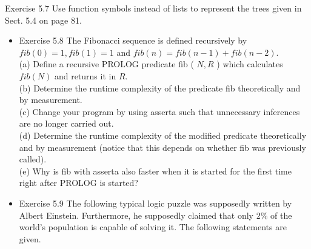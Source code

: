 \documentclass[10pt]{article}
\begin{document}
Exercise 5.7 Use function symbols instead of lists to represent the trees given in Sect. 5.4 on page 81.

\begin{itemize}
  \item Exercise 5.8 The Fibonacci sequence is defined recursively by $f i b(0)=1, f i b(1)=1$ and $f i b(n)=f i b(n-1)+f i b(n-2)$.\\
(a) Define a recursive PROLOG predicate fib ( $N, R$ ) which calculates $f i b(N)$ and returns it in $R$.\\
(b) Determine the runtime complexity of the predicate fib theoretically and by measurement.\\
(c) Change your program by using asserta such that unnecessary inferences are no longer carried out.\\
(d) Determine the runtime complexity of the modified predicate theoretically and by measurement (notice that this depends on whether fib was previously called).\\
(e) Why is fib with asserta also faster when it is started for the first time right after PROLOG is started?
  \item Exercise 5.9 The following typical logic puzzle was supposedly written by Albert Einstein. Furthermore, he supposedly claimed that only $2 \%$ of the world's population is capable of solving it. The following statements are given.
\end{itemize}
\end{document}
